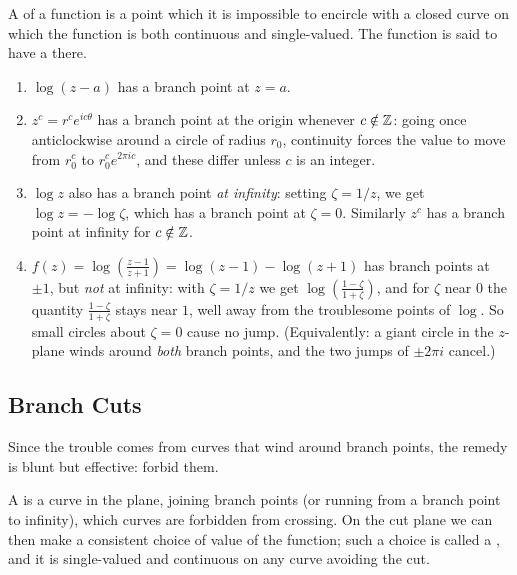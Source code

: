 \documentclass[a4paper]{scrartcl}
\begin{document}
\begin{definition}
	A  of a function is a point which it is impossible to encircle with a closed curve on which the function is both continuous and single-valued. The function is said to have a  there.
\end{definition}

\begin{example}
	\begin{enumerate}[label=(\roman*)]
		\item $\log(z - a)$ has a branch point at $z = a$.
		\item $z^c = r^c e^{ic\theta}$ has a branch point at the origin whenever $c \notin \mathbb{Z}$: going once anticlockwise around a circle of radius $r_0$, continuity forces the value to move from $r_0^c$ to $r_0^c e^{2\pi i c}$, and these differ unless $c$ is an integer.
		\item $\log z$ also has a branch point \emph{at infinity}: setting $\zeta = 1/z$, we get $\log z = -\log \zeta$, which has a branch point at $\zeta = 0$. Similarly $z^c$ has a branch point at infinity for $c \notin \mathbb{Z}$.
		\item $\displaystyle f(z) = \log\left(\frac{z - 1}{z + 1}\right) = \log(z-1) - \log(z+1)$ has branch points at $\pm 1$, but \emph{not} at infinity: with $\zeta = 1/z$ we get $\log\left(\frac{1 - \zeta}{1 + \zeta}\right)$, and for $\zeta$ near $0$ the quantity $\frac{1-\zeta}{1+\zeta}$ stays near $1$, well away from the troublesome points of $\log$. So small circles about $\zeta = 0$ cause no jump. (Equivalently: a giant circle in the $z$-plane winds around \emph{both} branch points, and the two jumps of $\pm 2\pi i$ cancel.)
	\end{enumerate}
\end{example}

\subsection{Branch Cuts}

Since the trouble comes from curves that wind around branch points, the remedy is blunt but effective: forbid them.

\begin{definition}
	A  is a curve in the plane, joining branch points (or running from a branch point to infinity), which curves are forbidden from crossing. On the cut plane we can then make a consistent choice of value of the function; such a choice is called a , and it is single-valued and continuous on any curve avoiding the cut.
\end{definition}
\end{document}
